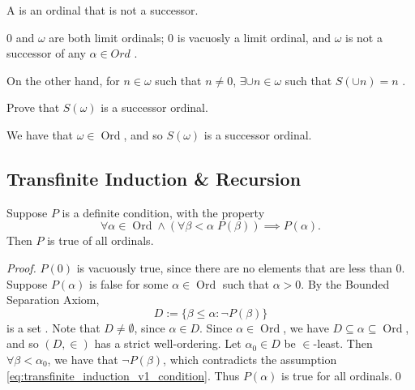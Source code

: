 \documentclass[notoc,notitlepage]{tufte-book}
\DeclareMathOperator{\Ord}{Ord }
\begin{document}
\begin{defn}
\label{defn:limit_ordinal}
  A  is an ordinal that is not a successor.
\end{defn}

\begin{eg}
  $0$ and $\omega$ are both limit ordinals; $0$ is vacuosly a limit ordinal, and $\omega$ is not a successor of any $\alpha \in Ord$ .

  On the other hand, for $n \in \omega$ such that $n \neq 0$, $\exists \cup n \in \omega$ such that $S(\cup n) = n$ .
\end{eg}

\begin{ex}
  Prove that $S(\omega)$ is a successor ordinal.
\end{ex}

\begin{solution}
  We have that $\omega \in \Ord$, and so $S(\omega)$ is a successor ordinal.
\end{solution}

\subsection{Transfinite Induction \& Recursion}%
\label{sub:transfinite_induction_n_recursion}

\begin{thm}
\label{thm:transfinite_induction_theorem_v1}
  Suppose $P$ is a definite condition, with the property
  \begin{equation}\label{eq:transfinite_induction_v1_condition}
    \forall \alpha \in \Ord \land ( \forall \beta < \alpha \; P(\beta) ) \implies P(\alpha).
  \end{equation}
  Then $P$ is true of all ordinals.
\end{thm}

\begin{proof}
  $P(0)$ is vacuously true, since there are no elements that are less than $0$. Suppose $P(\alpha)$ is false for some $\alpha \in \Ord$ such that $\alpha > 0$. By the Bounded Separation Axiom,
  \begin{equation*}
    D := \{ \beta \leq \alpha : \neg P(\beta) \}
  \end{equation*}
  is a set . Note that $D \neq \emptyset$, since $\alpha \in D$. Since $\alpha \in \Ord$, we have $D \subseteq \alpha \subseteq \Ord$, and so $(D, \in)$ has a strict well-ordering. Let $\alpha_0 \in D$ be $\in$-least. Then $\forall \beta < \alpha_0$, we have that $\neg P(\beta)$, which contradicts the assumption \cref{eq:transfinite_induction_v1_condition}. Thus $P(\alpha)$ is true for all ordinals.\qed
\end{proof}
\end{document}
